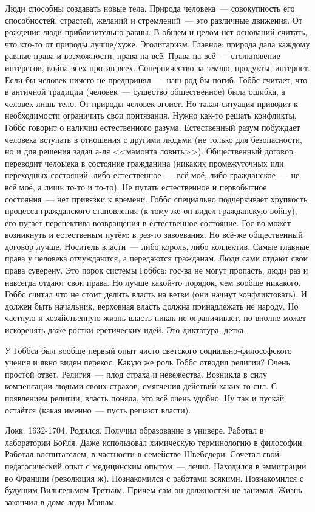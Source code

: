 Люди способны создавать новые тела. Природа человека~--- совокупность его способностей, страстей, желаний и стремлений~--- это различные движения. От рождения люди приблизительно равны. В общем и целом нет оснований считать, что кто-то от природы лучше/хуже. Эголитаризм. Главное: природа дала каждому равные права и возможности, права на всё. Права на всё~--- столкновение интересов, война всех против всех. Соперничество за землю, продукты, интернет. Если бы человек ничего не предпринял~--- наш род бы погиб. Гоббс считает, что в античной традиции (человек~--- существо общественное) была ошибка, а человек лишь тело. От природы человек эгоист. Но такая ситуация приводит к необходимости ограничить свои притязания. Нужно как-то решать конфликты. Гоббс говорит о наличии естественного разума. Естественный разум побуждает человека вступать в отношения с другими людьми (не только для безопасности, но и для решения задач а-ля <<мамонта ловить>>). Общественный договор переводит челоыека в состояние гражданина (никаких промежуточных или переходных состояний: либо естественное~--- всё моё, либо гражданское~--- не всё моё, а лишь то-то и то-то). Не путать естественное и первобытное состояния~--- нет привязки к времени. Гоббс специально подчеркивает хрупкость процесса гражданского становления (к тому же он видел гражданскую войну), его пугает перспектива возвращения в естественное состояние. Гос-во может возникнуть и естественым путём: в рез-то завоевания. Но всё-же общественный договор лучше. Носитель власти~--- либо король, либо коллектив. Самые главные права у человека отчуждаются, а передаются гражданам. Люди сами отдают свои права суверену. Это порок системы Гоббса: гос-ва не могут пропасть, люди раз и навсегда отдают свои права. Но лучше какой-то порядок, чем вообще никакого. Гоббс считал что не стоит делить власть на ветви (они начнут конфликтовать). И должен быть начальник, верховная власть должна принадлежать не народу. Но частную и хозяйственную жизнь власть никак не ограничивает, но вполне может искоренять даже ростки еретических идей. Это диктатура, детка.

У Гоббса был вообще первый опыт чисто светского социально-философского учения и явно виден перекос. Какую же роль Гоббс отводил религии? Очень простой ответ. Религия~--- плод страха и невежества. Возникла в силу компенсации людьми своих страхов, смягчения действий каких-то сил. С появлением религии, власть поняла, это всё очень удобно. Ну так и пускай остаётся (какая именно~--- пусть решают власти).

Локк. 1632-1704.
Родился. Получил образование в универе. Работал в лаборатории Бойля. Даже использовал химическую терминологию в философии. Работал воспитателем, в частности в семействе Швебсдери.
Сочетал свой педагогический опыт с медицинским опытом~--- лечил. Находился в эммиграции во Франции (революция ж). Познакомился с работами всякими. Познакомился с будущим Вильгельмом Третьим. Причем сам он должностей не занимал. Жизнь закончил в доме леди Мэшам.

